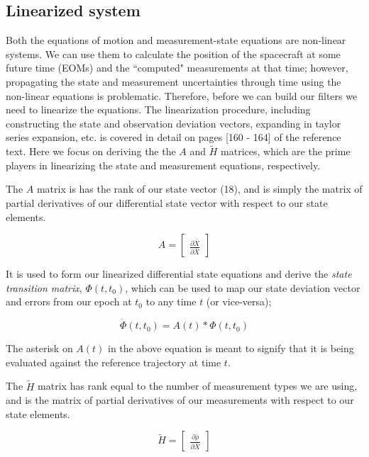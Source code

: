 \documentclass[10pt]{article}
\begin{document}
\subsection{Linearized system}

Both the equations of motion and measurement-state equations are non-linear systems. We can use them to calculate the position of the spacecraft at some future time (EOMs) and the ``computed" measurements at that time; however, propagating the state and measurement uncertainties through time using the non-linear equations is problematic. Therefore, before we can build our filters we need to linearize the equations.  The linearization procedure, including constructing the state and observation deviation vectors, expanding in taylor series expansion, etc. is covered in detail on pages [160 - 164] of the reference text. Here we focus on deriving the  the $A$ and $\tilde{H}$ matrices, which are the prime players in linearizing the state and measurement equations, respectively. 

The $A$ matrix is has the rank of our state vector (18), and is simply the matrix of partial derivatives of our differential state vector with respect to our state elements.

\begin{equation}
A  = 
    \begin{bmatrix} 
     \frac{\partial\dot{\bar{X}}}{\partial\bar{X}}      
     \end{bmatrix} 
\end{equation}

It is used to form our linearized differential state equations and derive the \emph{state transition matrix}, $\Phi(t,t_0)$, which can be used to map our state deviation vector and errors from our epoch at $t_0$ to any time $t$ (or vice-versa);

\begin{equation}
\dot{\Phi}(t,t_0)  = A(t)* \Phi(t,t_0)
\end{equation}

The asterisk on $A(t)$ in the above equation is meant to signify that it is being evaluated against the reference trajectory at time $t$.

The $\tilde{H}$ matrix has rank equal to the number of measurement types we are using, and is the matrix of partial derivatives of our measurements with respect to our state elements.

\begin{equation}
\tilde{H} = 
    \begin{bmatrix} 
     \frac{\partial\bar{\rho}}{\partial\bar{X}}      
     \end{bmatrix} 
\end{equation}
\end{document}
